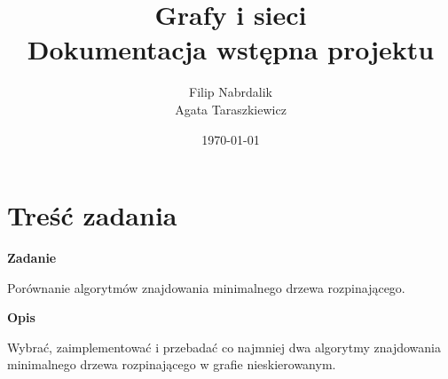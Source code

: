 \documentclass[a4paper, 10pt]{article}
\title{{\bf {Grafy i sieci}} \\ {\large Dokumentacja wstępna projektu}}
\date{\today}
\author{Filip Nabrdalik \\Agata Taraszkiewicz}
\begin{document}

\null  %
\nointerlineskip  %
\vfill
\let\snewpage \newpage
\let\newpage \relax
\maketitle 
\let \newpage \snewpage
\vfill
\break %

\tableofcontents

\newpage






\section{Treść zadania}

{\bf{Zadanie}}

Porównanie algorytmów znajdowania minimalnego drzewa rozpinającego.

{\bf{Opis}}

Wybrać, zaimplementować i przebadać co najmniej dwa algorytmy znajdowania minimalnego drzewa rozpinającego w grafie nieskierowanym. 



\section{}




\section{}


\section{}
\subsection{}



\nocite{*}

\end{document}
